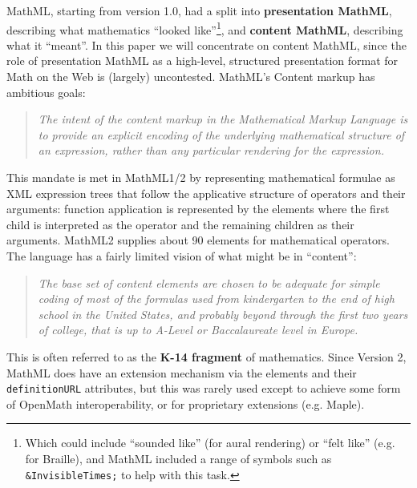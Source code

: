 \documentclass{llncs}
\begin{document}
MathML, starting from version 1.0, had a split into {\textbf{presentation MathML}},
describing what mathematics ``looked like''\footnote{Which could include ``sounded like''
  (for aural rendering) or ``felt like'' (e.g. for Braille), and MathML included a range
  of symbols such as {\texttt{\&InvisibleTimes;}} to help with this task.}, and
{\textbf{content MathML}}, describing what it ``meant''. In this paper we will concentrate
on content MathML, since the role of presentation MathML as a high-level, structured
presentation format for Math on the Web is (largely) uncontested. MathML's Content markup
has ambitious goals:
\begin{quotation}\noindent\em
  The intent of the content markup in the Mathematical Markup Language is to provide an
  explicit encoding of the {\emph{underlying mathematical structure}} of an expression,
  rather than any particular rendering for the expression.  \hfill{\hbox{\rm\cite[section
      4.1.1]{WorldWideWebConsortium2003b}}}
\end{quotation}
This mandate is met in MathML1/2 by representing mathematical formulae as XML expression
trees that follow the applicative structure of operators and their arguments: function
application is represented by the {} elements where the first child is
interpreted as the operator and the remaining children as their arguments. MathML2
supplies about 90 elements for mathematical operators. The language has a fairly limited
vision of what might be in ``content'':
\begin{quotation}\noindent\em
  The base set of content elements are chosen to be adequate for simple coding of most of
  the formulas used from kindergarten to the end of high school in the United States, and
  probably beyond through the first two years of college, that is up to A-Level or
  Baccalaureate level in Europe.\hfill{\hbox{\cite[4.1.2]{WorldWideWebConsortium2003b}}}
\end{quotation}
This is often referred to as the {\textbf{K-14 fragment}} of mathematics. Since Version 2,
MathML does have an extension mechanism via the {} elements and their
{\texttt{definitionURL}} attributes, but this was rarely used except to achieve some form
of OpenMath interoperability, or for proprietary extensions (e.g. Maple).
\end{document}
